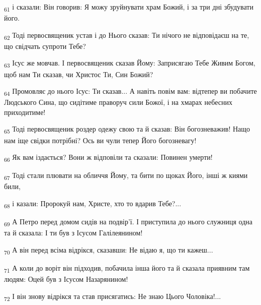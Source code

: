 \begin{tcolorbox}
\textsubscript{61} і сказали: Він говорив: Я можу зруйнувати храм Божий, і за три дні збудувати його.
\end{tcolorbox}
\begin{tcolorbox}
\textsubscript{62} Тоді первосвященик устав і до Нього сказав: Ти нічого не відповідаєш на те, що свідчать супроти Тебе?
\end{tcolorbox}
\begin{tcolorbox}
\textsubscript{63} Ісус же мовчав. І первосвященик сказав Йому: Заприсягаю Тебе Живим Богом, щоб нам Ти сказав, чи Христос Ти, Син Божий?
\end{tcolorbox}
\begin{tcolorbox}
\textsubscript{64} Промовляє до нього Ісус: Ти сказав... А навіть повім вам: відтепер ви побачите Людського Сина, що сидітиме праворуч сили Божої, і на хмарах небесних приходитиме!
\end{tcolorbox}
\begin{tcolorbox}
\textsubscript{65} Тоді первосвященик роздер одежу свою та й сказав: Він богозневажив! Нащо нам іще свідки потрібні? Ось ви чули тепер Його богозневагу!
\end{tcolorbox}
\begin{tcolorbox}
\textsubscript{66} Як вам іздається? Вони ж відповіли та сказали: Повинен умерти!
\end{tcolorbox}
\begin{tcolorbox}
\textsubscript{67} Тоді стали плювати на обличчя Йому, та бити по щоках Його, інші ж киями били,
\end{tcolorbox}
\begin{tcolorbox}
\textsubscript{68} і казали: Пророкуй нам, Христе, хто то вдарив Тебе?...
\end{tcolorbox}
\begin{tcolorbox}
\textsubscript{69} А Петро перед домом сидів на подвір'ї. І приступила до нього служниця одна та й сказала: І ти був з Ісусом Галілеянином!
\end{tcolorbox}
\begin{tcolorbox}
\textsubscript{70} А він перед всіма відрікся, сказавши: Не відаю я, що ти кажеш...
\end{tcolorbox}
\begin{tcolorbox}
\textsubscript{71} А коли до воріт він підходив, побачила інша його та й сказала приявним там людям: Оцей був з Ісусом Назарянином!
\end{tcolorbox}
\begin{tcolorbox}
\textsubscript{72} І він знову відрікся та став присягатись: Не знаю Цього Чоловіка!...
\end{tcolorbox}

